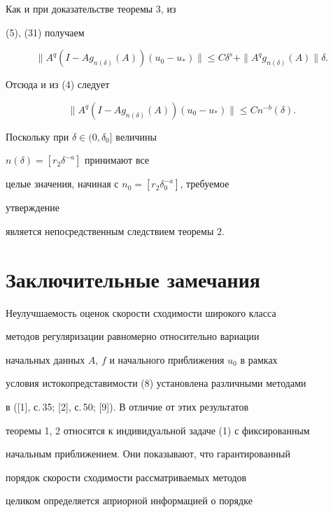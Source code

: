 \begin{pf} 


Как и при доказательстве теоремы 3, из 


(5), (31) получаем 


$$ 


\|A^q(I-A g_{n(\delta)}(A))(u_0-u_*)\|\le 


C\delta^s+\|A^q g_{n(\delta)}(A)\|\delta. 


$$ 


Отсюда и из (4) следует


$$ 


\|A^q(I-A g_{n(\delta)}(A))(u_0-u_*)\|\le C 


n^{-b}(\delta). 


$$ 


Поскольку при $\delta\in(0,\delta_0]$ величины 


$n(\delta)=[r_2\delta^{-a}]$ принимают все 


целые значения, начиная с $n_0=[r_2\delta^{-a}_0]$, требуемое 


утверждение 


является непосредственным следствием теоремы 2. 


\end{pf} 


 


\section{Заключительные замечания} 


 


Неулучшаемость оценок скорости сходимости широкого класса 


методов регуляризации равномерно относительно вариации 


начальных данных $A$, $f$ и начального приближения $u_0$ в рамках 


условия истокопредставимости (8) установлена различными методами 


в ([1], с.\,35; [2], с.\,50; [9]). В отличие от этих результатов 


теоремы 1, 2 относятся к индивидуальной задаче (1) с фиксированным 


начальным приближением. Они показывают, что гарантированный 


порядок скорости сходимости рассматриваемых методов 


целиком определяется априорной информацией о порядке 


